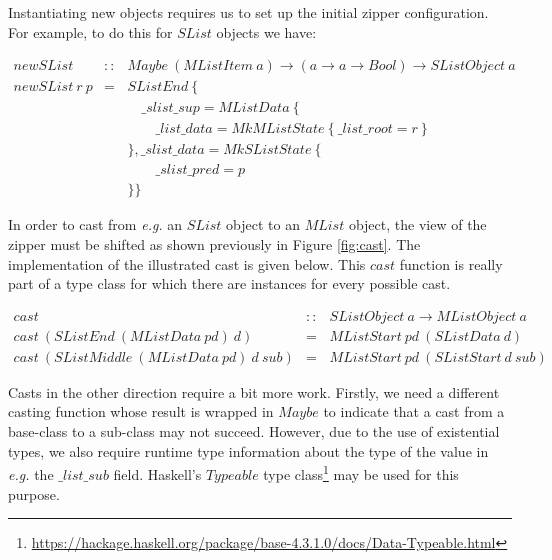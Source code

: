 \documentclass[runningheads,a4paper]{llncs}
\begin{document}
Instantiating new objects requires us to set up the initial zipper configuration. For example, to do this for $\mathit{SList}$ objects we have:

\begin{displaymath}
\begin{array}{lcl}
\mathit{newSList} & :: & \mathit{Maybe}~(\mathit{MListItem}~a) \to (a \to a \to \mathit{Bool}) \to \mathit{SListObject}~a \\
\mathit{newSList}~r~p & = & \mathit{SListEnd}~\{ \\
&& \quad \_\mathit{slist}\_\mathit{sup} = \mathit{MListData}~\{ \\
&& \qquad \_\mathit{list}\_\mathit{data} = \mathit{MkMListState}~\{~\_\mathit{list}\_\mathit{root} = r ~\}\\
&& \}, \_\mathit{slist}\_\mathit{data} = \mathit{MkSListState}~\{\\ 
&& \qquad \_\mathit{slist}\_\mathit{pred} = p\\
&& \}\}
\end{array}
\end{displaymath}

In order to cast from \emph{e.g.} an $\mathit{SList}$ object to an $\mathit{MList}$ object, the view of the zipper must be shifted as shown previously in Figure \ref{fig:cast}. The implementation of the illustrated cast is given below. This $\mathit{cast}$ function is really part of a type class for which there are instances for every possible cast.

\begin{displaymath}
\begin{array}{lcl}
\mathit{cast} & :: & \mathit{SListObject}~a \to \mathit{MListObject}~a \\
\mathit{cast}~(\mathit{SListEnd}~(\mathit{MListData}~\mathit{pd})~\mathit{d}) & = & \mathit{MListStart}~\mathit{pd}~(\mathit{SListData}~d) \\
\mathit{cast}~(\mathit{SListMiddle}~(\mathit{MListData}~\mathit{pd})~\mathit{d}~\mathit{sub}) & = & \mathit{MListStart}~\mathit{pd}~(\mathit{SListStart}~d~\mathit{sub})
\end{array}
\end{displaymath}

Casts in the other direction require a bit more work. Firstly, we need a different casting function whose result is wrapped in $\mathit{Maybe}$ to indicate that a cast from a base-class to a sub-class may not succeed. However, due to the use of existential types, we also require runtime type information about the type of the value in \emph{e.g.} the $\_\mathit{list}\_\mathit{sub}$ field. Haskell's $\mathit{Typeable}$ type class\footnote{\url{https://hackage.haskell.org/package/base-4.3.1.0/docs/Data-Typeable.html}} may be used for this purpose.
\end{document}
